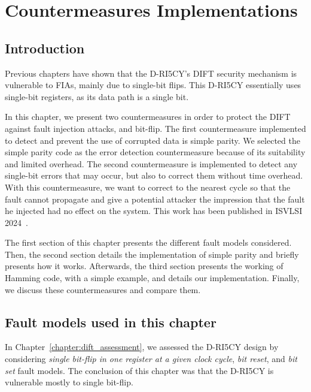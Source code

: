 \chapter{Countermeasures Implementations}
\label{chapter:countermeasures}
\minitoc

\section{Introduction}
Previous chapters have shown that the D-RI5CY's DIFT security mechanism is vulnerable to FIAs, mainly due to single-bit flips. This D-RI5CY essentially uses single-bit registers, as its data path is a single bit.

In this chapter, we present two countermeasures in order to protect the DIFT against fault injection attacks, and bit-flip.
The first countermeasure implemented to detect and prevent the use of corrupted data is simple parity. We selected the simple parity code as the error detection countermeasure because of its suitability and limited overhead.
The second countermeasure is implemented to detect any single-bit errors that may occur, but also to correct them without time overhead. With this countermeasure, we want to correct to the nearest cycle so that the fault cannot propagate and give a potential attacker the impression that the fault he injected had no effect on the system.
This work has been published in ISVLSI 2024~\cite{PRLG-24-isvlsi}.

The first section of this chapter presents the different fault models considered. Then, the second section details the implementation of simple parity and briefly presents how it works. Afterwards, the third section presents the working of Hamming code, with a simple example, and details our implementation. Finally, we discuss these countermeasures and compare them.

\section{Fault models used in this chapter}
In Chapter~\ref{chapter:dift_assessment}, we assessed the D-RI5CY design by considering \textit{single bit-flip in one register at a given clock cycle}, \textit{bit reset}, and \textit{bit set} fault models. The conclusion of this chapter was that the D-RI5CY is vulnerable mostly to single bit-flip.

